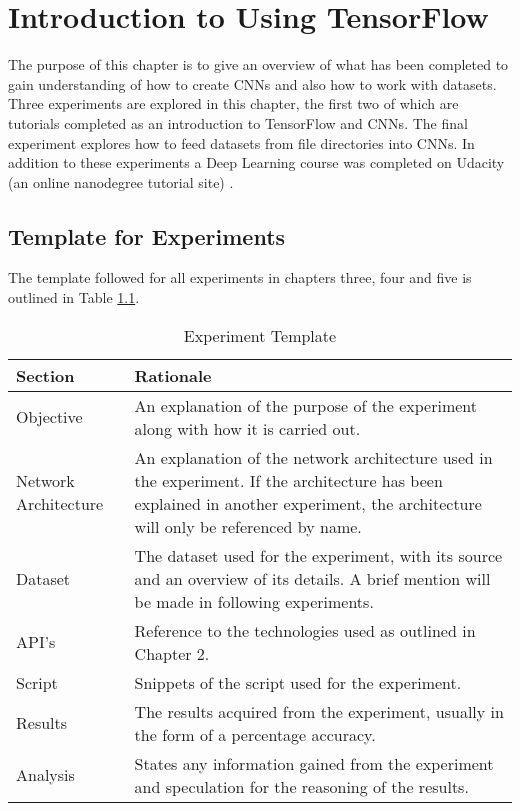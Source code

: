 \chapter{Introduction to Using TensorFlow}
The purpose of this chapter is to give an overview of what has been completed to gain understanding of how to create CNNs and also how to work with datasets.
Three experiments are explored in this chapter, the first two of which are tutorials completed as an introduction to TensorFlow and CNNs.
The final experiment explores how to feed datasets from file directories into CNNs.
In addition to these experiments a Deep Learning course was completed on Udacity (an online nanodegree tutorial site) \parencite{udacity}.

\section{Template for Experiments}
The template followed for all experiments in chapters three, four and five is outlined in Table \ref{expTemplate}.

\begin{table}[h]
\centering
\caption{Experiment Template}
\label{expTemplate}
\begin{tabular}{|p{3cm}|p{11cm}|}
\hline
\textbf{Section}   & \textbf{Rationale}                \\ \hline
Objective             & An explanation of the purpose of the experiment along with how it is carried out. \\ \hline
Network Architecture & An explanation of the network architecture used in the experiment. If the architecture has been explained in another experiment, the architecture will only be referenced by name.                       \\ \hline
Dataset              & The dataset used for the experiment, with its source and an overview of its details. A brief mention will be made in following experiments.                       \\ \hline
API's                & Reference to the technologies used as outlined in Chapter 2.                      \\ \hline
Script               & Snippets of the script used for the experiment.                       \\ \hline
Results              & The results acquired from the experiment, usually in the form of a percentage accuracy.                       \\ \hline
Analysis   & States any information gained from the experiment and speculation for the reasoning of the results.                      \\ \hline
\end{tabular}
\end{table}

